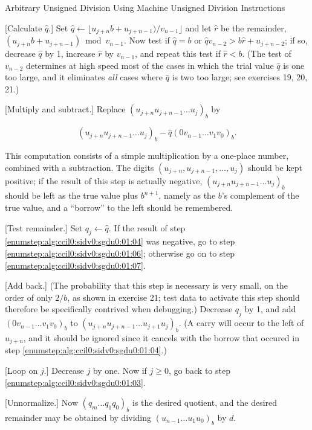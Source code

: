 \begin{vworkalgorithmstatementpar}{Arbitrary Unsigned Division Using 
Machine Unsigned Division Instructions}
\begin{algblvl0}
\item \label{enumstep:alg:ccil0:sidv0:sgdu0:01:03}
      [Calculate $\hat{q}$.]  Set
      $\hat{q} \gets \lfloor{}u_{j+n}b + u_{j+n-1})/v_{n-1}\rfloor$ and
      let $\hat{r}$ be the remainder, $(u_{j+n}b + u_{j+n-1}) \bmod v_{n-1}$.
      Now test if $\hat{q} = b$ or $\hat{q} v_{n-2} > b\hat{r} + u_{j+n-2}$;
      if so, decrease $\hat{q}$ by 1, increase $\hat{r}$ by $v_{n-1}$, and repeat
      this test if $\hat{r} < b$.  (The test of $v_{n-2}$ determines at high
      speed most of the cases in which the trial value $\hat{q}$ is one too large,
      and it eliminates \emph{all} cases where $\hat{q}$ is two too large;
      see exercises 19, 20, 21.)
\item \label{enumstep:alg:ccil0:sidv0:sgdu0:01:04}
      [Multiply and subtract.]  Replace $(u_{j+n} u_{j+n-1} \ldots{} u_j)_b$ by

      \begin{equation}
      \nonumber
      (u_{j+n} u_{j+n-1} \ldots{} u_j)_b - \hat{q} (0 v_{n-1} \ldots{} v_1 v_0)_b. 
      \end{equation}

      This computation consists of a simple multiplication by a one-place number,
      combined with a subtraction.  The digits $(u_{j+n}, u_{j+n-1}, \ldots{}, u_j)$
      should be kept positive; if the result of this step is actually negative, 
      $(u_{j+n} u_{j+n-1} \ldots{} u_j)_b$ should be left as the true
      value plus $b^{n+1}$, namely as the $b$'s complement of the true value, and 
      a ``borrow'' to the left should be remembered.
\item \label{enumstep:alg:ccil0:sidv0:sgdu0:01:05}
      [Test remainder.]  Set $q_j \gets \hat{q}$.  If the result of step 
      \ref{enumstep:alg:ccil0:sidv0:sgdu0:01:04} was negative, go to
      step \ref{enumstep:alg:ccil0:sidv0:sgdu0:01:06}; otherwise go on to
      step \ref{enumstep:alg:ccil0:sidv0:sgdu0:01:07}.
\item \label{enumstep:alg:ccil0:sidv0:sgdu0:01:06}
      [Add back.]  (The probability that this step is necessary is very small, on the 
      order of only $2/b$, as shown in exercise 21; test data to activate this step
      should therefore be specifically contrived when debugging.)  Decrease 
      $q_j$ by 1, and add $(0 v_{n-1} \ldots v_1 v_0)_b$ to
      $(u_{j+n} u_{j+n-1} \ldots{} u_{j+1} u_j)_b$.  (A carry will occur to the left of
      $u_{j+n}$, and it should be ignored since it cancels with the borrow that
      occured in step \ref{enumstep:alg:ccil0:sidv0:sgdu0:01:04}.) 
\item \label{enumstep:alg:ccil0:sidv0:sgdu0:01:07}
      [Loop on $j$.]  Decrease $j$ by one.  Now if $j \geq 0$, go back to step
      \ref{enumstep:alg:ccil0:sidv0:sgdu0:01:03}.
\item \label{enumstep:alg:ccil0:sidv0:sgdu0:01:08}
      [Unnormalize.]  Now $(q_m \ldots{} q_1 q_0)_b$ is the desired quotient, and
      the desired remainder may be obtained by dividing 
      $(u_{n-1} \ldots{} u_1 u_0)_b$ by $d$.
\end{algblvl0}
\end{vworkalgorithmstatementpar}
